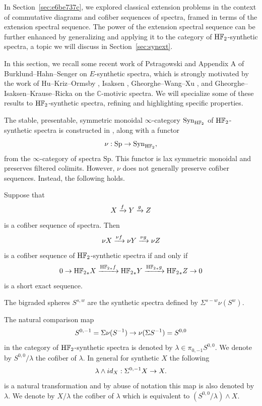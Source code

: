 \documentclass{amsart}
\numberwithin{equation}{section}
\newcommand{\HF}{\mathrm{H}\bF_2}
\begin{document}

In Section~\ref{sec:e6be737c}, we explored classical extension problems in the context of commutative diagrams and cofiber sequences of spectra, framed in terms of the extension spectral sequence. The power of the extension spectral sequence can be further enhanced by generalizing and applying it to the category of $\HF$-synthetic spectra, a topic we will discuss in Section~\ref{sec:synext}.

In this section, we recall some recent work of Pstragowski \cite{Pst} and Appendix A of Burklund--Hahn--Senger \cite{BHS} on $E$-synthetic spectra, which is strongly motivated by the work of Hu--Kriz--Ormsby \cite{HuKrizOrmsby}, Isaksen \cite{Isaksen}, Gheorghe--Wang--Xu \cite{GWX}, and Gheorghe--Isaksen--Krause--Ricka \cite{GIKR} on the $\mathbb{C}$-motivic spectra. We will specialize some of these results to $\HF$-synthetic spectra, refining and highlighting specific properties.

The stable, presentable, symmetric monoidal $\infty$-category $\mathrm{Syn}_{\HF}$ of $\HF$-synthetic spectra is constructed in \cite{Pst}, along with a functor
$$\nu: \mathrm{Sp}\to \mathrm{Syn}_{\HF},$$
from the $\infty$-category of spectra $\mathrm{Sp}$. This functor is lax symmetric monoidal and preserves filtered colimits. However, $\nu$ does not generally preserve cofiber sequences. Instead, the following holds.

\begin{proposition}\label{prop:1f7950df}
    Suppose that
    $$X\xrightarrow{f} Y\xrightarrow{g} Z$$
    is a cofiber sequence of spectra. Then
    $$\nu X\xrightarrow{\nu f}\nu Y\xrightarrow{\nu g} \nu Z$$
    is a cofiber sequence of ${\HF}$-synthetic spectra if and only if
    $$0\to {\HF}_*X\fto{{\HF}_*f} {\HF}_*Y\fto{{\HF}_*g} {\HF}_*Z\to 0$$
    is a short exact sequence.
\end{proposition}


\begin{definition}
The bigraded spheres $S^{s,w}$ are the synthetic spectra defined by $\Sigma^{s-w}\nu (S^w)$.
\end{definition}

\begin{definition}
    The natural comparison map
    $$S^{0,-1}=\Sigma \nu (S^{-1})\to \nu(\Sigma S^{-1})=S^{0,0}$$
    in the category of $\HF$-synthetic spectra is denoted by $\lambda\in \pi_{0,-1}S^{0,0}$. We denote by $S^{0,0}/\lambda$ the cofiber of $\lambda$. In general for synthetic $X$ the following
    $$\lambda\wedge id_X: \Sigma^{0,-1}X\to X.$$
    is a natural transformation and by abuse of notation this map is also denoted by $\lambda$.
    We denote by $X/\lambda$ the cofiber of $\lambda$
    which is equivalent to $(S^{0,0}/\lambda) \wedge X$.
\end{definition}
\end{document}
